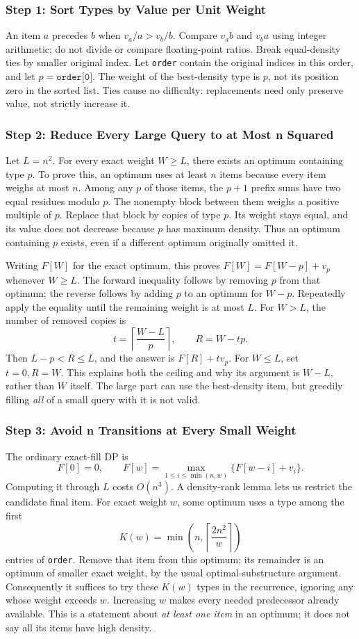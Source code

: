 \subsubsection*{Step 1: Sort Types by Value per Unit Weight}
An item $a$ precedes $b$ when $v_a/a>v_b/b$. Compare
$v_a b$ and $v_b a$ using integer arithmetic; do not divide or compare
floating-point ratios. Break equal-density ties by smaller original
index. Let \texttt{order} contain the original indices in this order,
and let $p=\texttt{order[0]}$. The weight of the best-density type
is $p$, not its position zero in the sorted list.
Ties cause no difficulty: replacements need only preserve value,
not strictly increase it.

\subsubsection*{Step 2: Reduce Every Large Query to at Most n Squared}
Let $L=n^2$. For every exact weight $W\ge L$, there exists an optimum
containing type $p$. To prove this, an optimum uses at least $n$
items because every item weighs at most $n$. Among any $p$ of those
items, the $p+1$ prefix sums have two equal residues modulo $p$.
The nonempty block between them weighs a positive multiple of $p$.
Replace that block by copies of type $p$. Its weight stays equal,
and its value does not decrease because $p$ has maximum density.
Thus an optimum containing $p$ exists, even if a different optimum
originally omitted it.

Writing $F[W]$ for the exact optimum, this proves
$F[W]=F[W-p]+v_p$ whenever $W\ge L$.
The forward inequality follows by removing $p$ from that optimum;
the reverse follows by adding $p$ to an optimum for $W-p$.
Repeatedly apply the equality until the remaining weight is at most
$L$. For $W>L$, the number of removed copies is
\[
 t=\left\lceil\frac{W-L}{p}\right\rceil,\qquad R=W-tp.
\]
Then $L-p<R\le L$, and the answer is $F[R]+t v_p$.
For $W\le L$, set $t=0,R=W$. This explains both the ceiling and
why its argument is $W-L$, rather than $W$ itself. The large part
can use the best-density item, but greedily filling \emph{all} of a
small query with it is not valid.

\subsubsection*{Step 3: Avoid n Transitions at Every Small Weight}
The ordinary exact-fill DP is
\[
 F[0]=0,\qquad F[w]=\max_{1\le i\le\min(n,w)}
                            \{F[w-i]+v_i\}.
\]
Computing it through $L$ costs $O(n^3)$. A density-rank lemma lets
us restrict the candidate final item. For exact weight $w$, some
optimum uses a type among the first
\[
 K(w)=\min\left(n,\left\lceil\frac{2n^2}{w}\right\rceil\right)
\]
entries of \texttt{order}. Remove that item from this optimum; its
remainder is an optimum of smaller exact weight, by the usual
optimal-substructure argument. Consequently it suffices to try these
$K(w)$ types in the recurrence, ignoring any whose weight exceeds
$w$. Increasing $w$ makes every needed predecessor already available.
This is a statement about \emph{at least one item} in an optimum;
it does not say all its items have high density.

